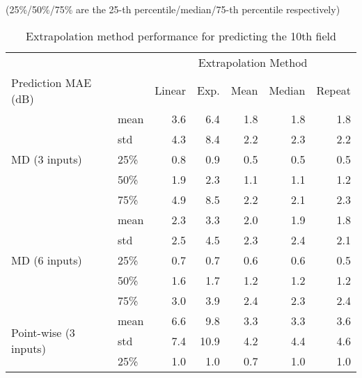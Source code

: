 \begin{table}[t]
\centering
\caption[Extrapolation method performance for predicting the 10th field]{Extrapolation method performance for predicting the 10th field} \label{tab:extrapresult}
(25\%/50\%/75\% are the 25-th percentile/median/75-th percentile respectively)
\begin{tabular}{@{}llrrrrr}
	\toprule
	                                                  &      &   \multicolumn{5}{c}{Extrapolation Method}    \\
	\cmidrule{3-7}                      
	Prediction \ac{MAE} (dB)              &      & Linear & Exp. & Mean & Median & Repeat \\ \midrule
	\multirow{5}{*}{MD (3 inputs)}         & mean &    3.6 &         6.4 &  1.8 &    1.8 &    1.8 \\
	                                                  & std  &    4.3 &         8.4 &  2.2 &    2.3 &    2.2 \\
	                                                  & 25\% &    0.8 &         0.9 &  0.5 &    0.5 &    0.5 \\
	                                                  & 50\% &    1.9 &         2.3 &  1.1 &    1.1 &    1.2 \\
	                                                  & 75\% &    4.9 &         8.5 &  2.2 &    2.1 &    2.3 \\ \midrule
	\multirow{5}{*}{MD (6 inputs)}         & mean &    2.3 &         3.3 &  2.0 &    1.9 &    1.8 \\
	                                                  & std  &    2.5 &         4.5 &  2.3 &    2.4 &    2.1 \\
	                                                  & 25\% &    0.7 &         0.7 &  0.6 &    0.6 &    0.5 \\
	                                                  & 50\% &    1.6 &         1.7 &  1.2 &    1.2 &    1.2 \\
	                                                  & 75\% &    3.0 &         3.9 &  2.4 &    2.3 &    2.4 \\ \midrule
	\multirow{5}{*}{Point-wise (3 inputs)} & mean &    6.6 &         9.8 &  3.3 &    3.3 &    3.6 \\
	                                                  & std  &    7.4 &        10.9 &  4.2 &    4.4 &    4.6 \\
	                                                  & 25\% &    1.0 &         1.0 &  0.7 &    1.0 &    1.0 \\

\end{tabular}
\end{table}
